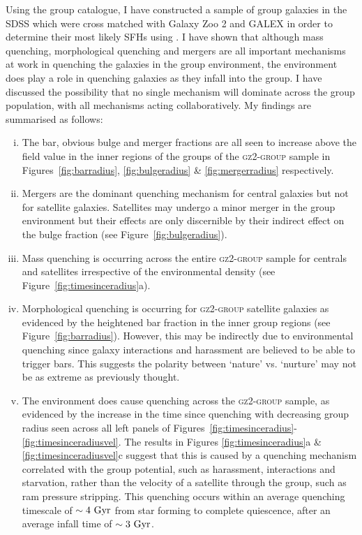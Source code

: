 Using the \citet{berlind06} group catalogue, I have constructed a sample of group galaxies in the SDSS which were cross matched with Galaxy Zoo 2 and GALEX in order to determine their most likely SFHs using \starpy. I have shown that although mass quenching, morphological quenching and mergers are all important mechanisms at work in quenching the galaxies in the group environment, the environment does play a role in quenching galaxies as they infall into the group. I have discussed the possibility that no single mechanism will dominate across the group population, with all mechanisms acting collaboratively. My findings are summarised as follows:
\begin{enumerate}[(i)]
\item The bar, obvious bulge and merger fractions are all seen to increase above the field value in the inner regions of the groups of the \textsc{gz2-group} sample in Figures~\ref{fig:barradius}, \ref{fig:bulgeradius} \& \ref{fig:mergerradius} respectively.  
 
\item Mergers are the dominant quenching mechanism for central galaxies but not for satellite galaxies. Satellites may undergo a minor merger in the group environment but their effects are only discernible by their indirect effect on the bulge fraction (see Figure~\ref{fig:bulgeradius}).
 
\item Mass quenching is occurring across the entire \textsc{gz2-group} sample for centrals and satellites irrespective of the environmental density (see Figure~\ref{fig:timesinceradius}a).
 
\item Morphological quenching is occurring for \textsc{gz2-group} satellite galaxies as evidenced by the heightened bar fraction in the inner group regions (see Figure~\ref{fig:barradius}). However, this may be indirectly due to environmental quenching since galaxy interactions and harassment are believed to be able to trigger bars. This suggests the polarity between `nature' vs. `nurture' may not be as extreme as previously thought. 

\item The environment does cause quenching across the \textsc{gz2-group} sample, as evidenced by the increase in the time since quenching with decreasing group radius seen across all left panels of Figures~\ref{fig:timesinceradius}-\ref{fig:timesinceradiusvel}. The results in Figures \ref{fig:timesinceradius}a \&  \ref{fig:timesinceradiusvel}c suggest that this is caused by a quenching mechanism correlated with the group potential, such as harassment, interactions and starvation, rather than the velocity of a satellite through the group, such as ram pressure stripping. This quenching occurs within an average quenching timescale of $\sim4~\rm{Gyr}$ from star forming to complete quiescence, after an average infall time of $\sim 3 ~\rm{Gyr}$. 
  

\end{enumerate}
